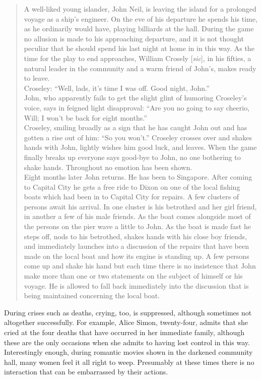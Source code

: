 \documentclass[openany,nobib]{tufte-book}
\begin{document}
\begin{quote}
A well-liked young islander, John Neil, is leaving the island for a
prolonged voyage as a ship's engineer. On the eve of his departure he
spends his time, as he ordinarily would have, playing billiards at the
hall. During the game no allusion is made to his approaching departure,
and it is not thought peculiar that he should spend his last night at
home in in this way. As the time for the play to end approaches, William
Crosely {[}\emph{sic}{]}, in his fifties, a natural leader in the
community and a warm friend of John's, makes ready to leave. \\
Croseley: ``Well, lads, it's time I was off. Good night, John.'' \\
John, who apparently fails to get the slight glint of humoring
Croseley's voice, says in feigned light disapproval: ``Are you no going
to say cheerio, Will; I won't be back for eight months.'' \\
Croseley, smiling broadly as a sign that he has caught John out and has
gotten a rise out of him: ``So you won't.'' Croseley crosses over and
shakes hands with John, lightly wishes him good luck, and leaves. When
the game finally breaks up everyone says good-bye to John, no one
bothering to shake hands. Throughout no emotion has been shown. \\
Eight months later John returns. He has been to Singapore. After coming
to Capital City he gets a free ride to Dixon on one of the local fishing
boats which had been in to Capital City for repairs. A few clusters of
persons await his arrival. In one cluster is his betrothed and her girl
friend, in another a few of his male friends. As the boat comes
alongside most of the persons on the pier wave a little to John. As the
boat is made fast he steps off, nods to his betrothed, shakes hands with
his close boy friends, and immediately launches into a discussion of the
repairs that have been made on the local boat and how its engine is
standing up. A few persons come up and shake his hand but each time
there is no insistence that John make more than one or two statements on
the subject of himself or his voyage. He is allowed to fall back
immediately into the discussion that is being maintained concerning the
local boat.
\end{quote}

During crises such as deaths, crying, too, is suppressed, although
sometimes not altogether successfully. For example, Alice Simon,
twenty-four, admits that she cried at the four deaths that have occurred
in her immediate family, although these are the only occasions when she
admits to having lost control in this way. Interestingly enough, during
romantic movies shown in the darkened community hall, many women feel it
all right to weep. Presumably at these times there is no interaction
that can be embarrassed by their actions.
\end{document}
